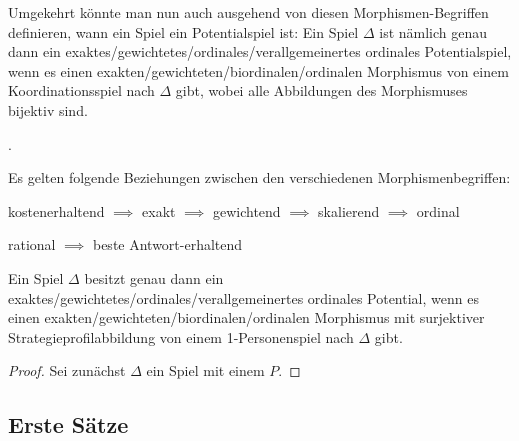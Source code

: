 \begin{bem}
	Umgekehrt könnte man nun auch ausgehend von diesen Morphismen-Begriffen definieren, wann ein Spiel ein Potentialspiel ist: Ein Spiel $\Delta$ ist nämlich genau dann ein exaktes/gewichtetes/ordinales/verallgemeinertes ordinales Potentialspiel, wenn es einen exakten/gewichteten/biordinalen/ordinalen Morphismus von einem Koordinationsspiel nach $\Delta$ gibt, wobei alle Abbildungen des Morphismuses bijektiv sind.
\end{bem}



\begin{bsp}.
	
\end{bsp}

\begin{beob}
	Es gelten folgende Beziehungen zwischen den verschiedenen Morphismenbegriffen:
	\begin{center}
		kostenerhaltend $\implies$ exakt $\implies$ gewichtend $\implies$ skalierend $\implies$ ordinal
		
		rational $\implies$ beste Antwort-erhaltend
		
		
	\end{center}
\end{beob}

\begin{bsp}
	Ein Spiel $\Delta$ besitzt genau dann ein exaktes/gewichtetes/ordinales/verallgemeinertes ordinales Potential, wenn es einen exakten/gewichteten/biordinalen/ordinalen Morphismus mit surjektiver Strategieprofilabbildung von einem 1-Personenspiel nach $\Delta$ gibt.
	
\end{bsp}

\begin{proof}
	Sei zunächst $\Delta$ ein Spiel mit einem \sPot{} $P$. 
\end{proof}


\subsection{Erste Sätze}

